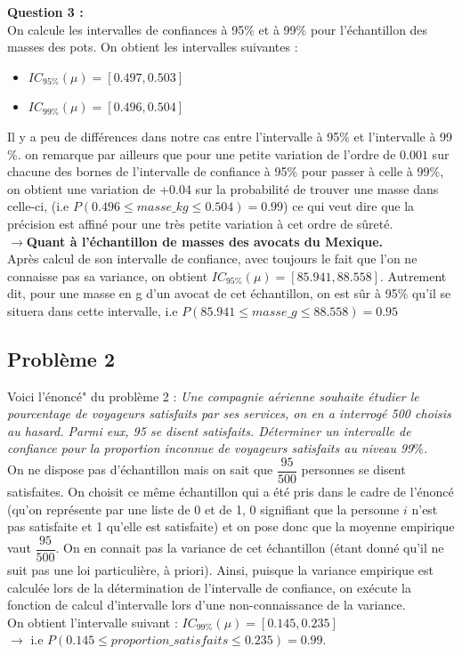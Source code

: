 \documentclass{article}      %
\begin{document}
\textbf{Question 3 :} \\ On calcule les intervalles de confiances à 95$\%$ et à 99$\%$ pour l'échantillon des masses des pots. On obtient les intervalles suivantes : \\

\begin{center}
	\begin{itemize}
		\item $IC_{95\%}(\mu) = [0.497, 0.503]$
		\item $IC_{99\%}(\mu) = [0.496, 0.504]$
	\end{itemize}
\end{center} 

Il y a peu de différences dans notre cas entre l'intervalle à 95$\%$ et l'intervalle à 99$\%$. on remarque par ailleurs que pour une petite variation de l'ordre de $0.001$ sur chacune des bornes de l'intervalle de confiance à 95$\%$ pour passer à celle à 99$\%$, on obtient une variation de +0.04 sur la probabilité de trouver une masse dans celle-ci, (i.e $P(0.496 \le masse\_kg \le 0.504) = 0.99$) ce qui veut dire que la précision est affiné pour une très petite variation à cet ordre de sûreté.\\

$\rightarrow$\textbf{Quant à l'échantillon de masses des avocats du Mexique.}\\
Après calcul de son intervalle de confiance, avec toujours le fait que l'on ne connaisse pas sa variance, on obtient $IC_{95\%}(\mu) = [85.941, 88.558]$. Autrement dit, pour une masse en g d'un avocat de cet échantillon, on est sûr à 95$\%$ qu'il se situera dans cette intervalle, i.e $P(85.941 \le masse\_g \le 88.558) = 0.95$

\subsection{Problème 2}
Voici l'énoncé" du problème 2 : \textit{Une compagnie aérienne souhaite étudier le pourcentage de voyageurs satisfaits par ses services, on en a interrogé 500 choisis au hasard. Parmi eux, 95
se disent satisfaits. Déterminer un intervalle de confiance pour la proportion
inconnue de voyageurs satisfaits au niveau 99$\%$.}\\

On ne dispose pas d'échantillon mais on sait que $\dfrac{95}{500}$ personnes se disent satisfaites. On choisit ce même échantillon qui a été pris dans le cadre de l'énoncé (qu'on représente par une liste de 0 et de 1, 0 signifiant que la personne $i$ n'est pas satisfaite et 1 qu'elle est satisfaite) et on pose donc que la moyenne empirique vaut $\dfrac{95}{500}$. On en connait pas la variance de cet échantillon (étant donné qu'il ne suit pas une loi particulière, à priori). Ainsi, puisque la variance empirique est calculée lors de la détermination de l'intervalle de confiance, on exécute la fonction de calcul d'intervalle lors d'une non-connaissance de la variance.\\
On obtient l'intervalle suivant : $IC_{99\%}(\mu) = [0.145, 0.235]$ \\$\rightarrow$ i.e $P(0.145 \le proportion\_satisfaits \le 0.235) = 0.99$.\\
\end{document}
